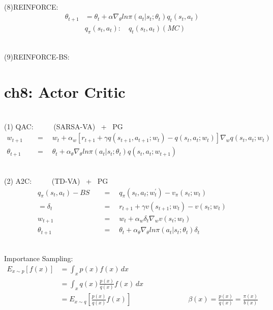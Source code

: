 \documentclass{article}
\begin{document}
~ \\[3pt]
(8)REINFORCE: 
\begin{align*}
    \theta_{t+1} &= \theta_{t} + \alpha \nabla_{\theta} 
                    ln \pi (a_{t} | s_{t}; \theta_{t}) q_{t} (s_{t}, a_{t}) \\[3pt]
    & q_{\pi} (s_{t}, a_{t}) : \quad q_{t} (s_{t}, a_{t}) (MC) 
\end{align*}


~ \\[3pt]
(9)REINFORCE-BS: 


\newpage
\section*{ch8: Actor Critic}


~ \\[3pt]
(1) QAC: \ \ \ \ \ {(SARSA-VA) \ + \ PG} 
\begin{align*}
    w_{t+1} & 
            \quad = \quad w_{t} + \alpha_{w} 
            [ r_{t+1} + \gamma q(s_{t+1}, a_{t+1}; w_{t}) 
            - q(s_{t}, a_{t}; w_{t}) ] 
            \nabla_{w} q(s_{t}, a_{t}; w_{t}) \\[3pt]
    \theta_{t+1} & 
            \quad = \quad \theta_{t} + \alpha_{\theta} \nabla_{\theta} 
            ln \pi (a_{t} | s_{t}; \theta_{t}) q(s_{t}, a_{t}; w_{t+1}) 
\end{align*}


~ \\[3pt]
(2) A2C: \ \ \ \ \ {(TD-VA) \ + \ PG} 
\begin{align*}
    q_{\pi}(s_{t}, a_{t}) - BS & 
            \quad = \quad 
            q_{\pi}(s_{t}, a_{t}; w_{t}^{'}) 
            - v_{\pi}(s_{t}; w_{t}) \\[3pt]
    = \delta_{t} & 
            \quad = \quad 
            r_{t+1} + \gamma v(s_{t+1}; w_{t}) 
            - v(s_{t}; w_{t}) \\[3pt]
    w_{t+1} & 
            \quad = \quad w_{t} + \alpha_{w} \delta_{t} 
            \nabla_{w} v(s_{t}; w_{t}) \\[3pt]
    \theta_{t+1} & 
            \quad = \quad \theta_{t} + \alpha_{\theta} \nabla_{\theta} 
            ln \pi (a_{t} | s_{t}; \theta_{t}) \delta_{t} 
\end{align*}


~ \\[3pt]
Importance Sampling: 
\begin{align*}
    E_{x \sim p} [f(x)] &= \int_{x} p(x) f(x) \,dx \\[3pt]
                        &= \int_{x} q(x) \frac{p(x)}{q(x)} f(x) \,dx \\[3pt]
                        &= E_{x \sim q} \left[ \frac{p(x)}{q(x)} f(x) \right] 
                        \qquad \qquad \qquad \qquad 
                        \beta(x) = \frac{p(x)}{q(x)} = \frac{\pi(x)}{b(x)} 
\end{align*}
\end{document}
